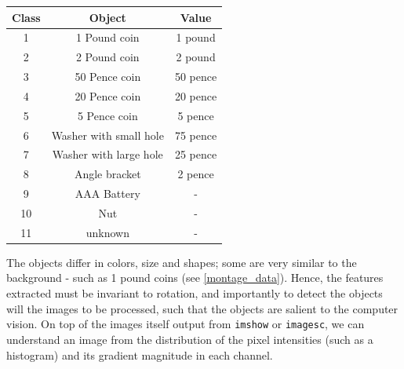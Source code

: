 \documentclass[main.tex]{subfiles}
\begin{document}
\begin{center}
  \begin{tabular}{ |c|c|c| }
    \hline
    Class & Object & Value\\
    \hline
    1 & 1 Pound coin            & 1 pound\\
    2 & 2 Pound coin            & 2 pound\\
    3 & 50 Pence coin           & 50 pence\\
    4 & 20 Pence coin           & 20 pence\\
    5 & 5 Pence coin            & 5 pence\\
    6 & Washer with small hole  & 75 pence\\
    7 & Washer with large hole  & 25 pence\\
    8 & Angle bracket           & 2 pence\\
    9 & AAA Battery             & - \\
    10 & Nut                    & - \\
    11 & unknown                & - \\
    \hline
  \end{tabular}
\end{center}

The objects differ in colors, size and shapes; some are very similar to the background - such as 1 pound coins (see \autoref{montage_data}). Hence, the features extracted must be invariant to rotation, and importantly to detect the objects will the images to be processed, such that the objects are salient to the computer vision. On top of the images itself output from \verb+imshow+ or \verb+imagesc+, we can understand an image from the distribution of the pixel intensities (such as a histogram) and its gradient magnitude in each channel.
\end{document}
